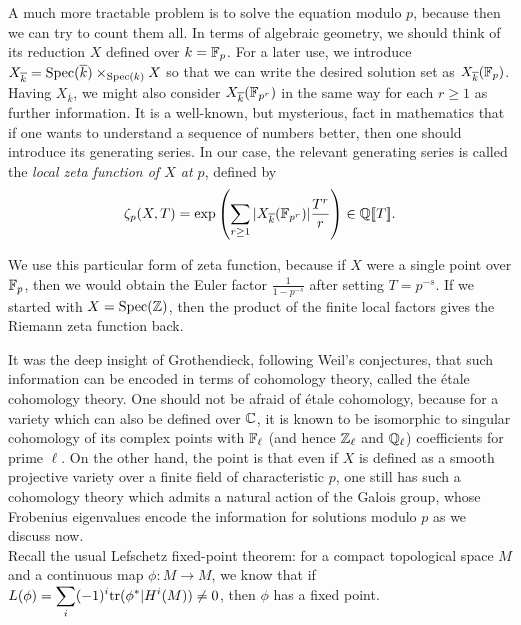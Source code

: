 A much more tractable problem is to solve the equation modulo $p$, because then we can try to count them all. In terms of algebraic geometry, we should think of its reduction $X$ defined over $k=\mathbb{F}_p$. For a later use, we introduce $X_{\overline{k}} = \mathrm{Spec}(\overline{k}) \times_{\mathrm{Spec}(k) } X $ so that we can write the desired solution set as $X_{\overline{k}}(\mathbb{F}_p)$. Having $X_{\overline{k}}$, we might also consider $X_{\overline{k}}(\mathbb{F}_{p^r})$ in the same way for each $r \geq 1$ as further information. It is a well-known, but mysterious, fact in mathematics that if one wants to understand a sequence of numbers better, then one should introduce its generating series. In our case, the relevant generating series is called the \textit{local zeta function of $X$ at $p$}, defined by \[\zeta_p(X,T) = \mathrm{exp}\left( \displaystyle\sum_{r \geq 1} |X_{\overline{k}}(\mathbb{F}_{p^r})| \frac{T^r}{r} \right) \in \mathbb{Q}[\![T]\!]. \]

\begin{rem*}
We use this particular form of zeta function, because if $X$ were a single point over $\mathbb{F}_p$, then we would obtain the Euler factor $\frac{1}{1- p^{-s}}$ after setting $T=p^{-s}$. If we started with $X= \mathrm{Spec}(\mathbb{Z})$, then the product of the finite local factors gives the Riemann zeta function back.
\end{rem*}

It was the deep insight of Grothendieck, following Weil's conjectures, that such information can be encoded in terms of cohomology theory, called the \'etale cohomology theory. One should not be afraid of \'etale cohomology, because for a variety which can also be defined over $\mathbb{C}$, it is known to be isomorphic to singular cohomology of its complex points with $\mathbb{F}_\ell$ (and hence $\mathbb{Z}_\ell$ and $\mathbb{Q}_\ell$) coefficients for prime $\ell$. On the other hand, the point is that even if $X$ is defined as a smooth projective variety over a finite field of characteristic $p$, one still has such a cohomology theory which admits a natural action of the Galois group, whose Frobenius eigenvalues encode the information for solutions modulo $p$ as we discuss now.\\

Recall the usual Lefschetz fixed-point theorem: for a compact topological space $M$ and a continuous map $\phi \colon M\rightarrow M$, we know that if $L(\phi) = \displaystyle\sum_{i} (-1)^i \mathrm{tr}( \phi^* | H^i(M) ) \neq 0$, then $\phi$ has a fixed point.\\

